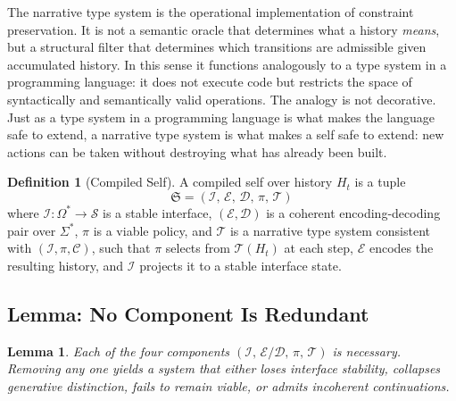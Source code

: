 \documentclass[12pt, a4paper]{article}
\theoremstyle{plain}
\newtheorem{lemma}[theorem]{Lemma}
\theoremstyle{definition}
\newtheorem{definition}[theorem]{Definition}
\theoremstyle{remark}
\begin{document}
The narrative type system is the operational implementation of constraint preservation. It is not a semantic oracle that determines what a history \emph{means}, but a structural filter that determines which transitions are admissible given accumulated history. In this sense it functions analogously to a type system in a programming language: it does not execute code but restricts the space of syntactically and semantically valid operations. The analogy is not decorative. Just as a type system in a programming language is what makes the language safe to extend, a narrative type system is what makes a self safe to extend: new actions can be taken without destroying what has already been built.

\begin{definition}[Compiled Self]
A compiled self over history $H_t$ is a tuple
\[
\mathfrak{S} = (\mathcal{I},\, \mathcal{E},\, \mathcal{D},\, \pi,\, \mathcal{T})
\]
where $\mathcal{I} : \Omega^* \to \mathcal{S}$ is a stable interface, $(\mathcal{E}, \mathcal{D})$ is a coherent encoding-decoding pair over $\Sigma^*$, $\pi$ is a viable policy, and $\mathcal{T}$ is a narrative type system consistent with $(\mathcal{I}, \pi, \mathcal{C})$, such that $\pi$ selects from $\mathcal{T}(H_t)$ at each step, $\mathcal{E}$ encodes the resulting history, and $\mathcal{I}$ projects it to a stable interface state.
\end{definition}

\subsection{Lemma: No Component Is Redundant}

\begin{lemma}
Each of the four components $(\mathcal{I},\, \mathcal{E}/\mathcal{D},\, \pi,\, \mathcal{T})$ is necessary. Removing any one yields a system that either loses interface stability, collapses generative distinction, fails to remain viable, or admits incoherent continuations.
\end{lemma}
\end{document}
